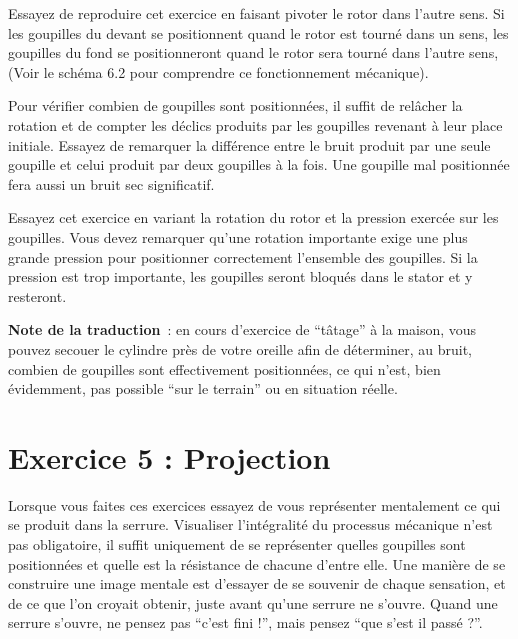 \documentclass[a4paper,french,11pt,twoside]{report}
\begin{document}
Essayez de reproduire cet exercice en faisant pivoter le rotor dans l'autre sens. Si les goupilles du devant se positionnent quand le rotor est tourné dans un sens, les goupilles du fond se positionneront quand le rotor sera tourné dans l'autre sens, (Voir le schéma 6.2 pour comprendre ce fonctionnement mécanique).

Pour vérifier combien de goupilles sont positionnées, il suffit de relâcher la rotation et de compter les déclics produits par les goupilles revenant à leur place initiale. Essayez de remarquer la différence entre le bruit produit par une seule goupille et celui produit par deux goupilles à la fois. Une goupille mal positionnée fera aussi un bruit sec significatif.

Essayez cet exercice en variant la rotation du rotor et la pression exercée sur les goupilles. Vous devez remarquer qu'une rotation importante exige une plus grande pression pour positionner correctement l'ensemble des goupilles. Si la pression est trop importante, les goupilles seront bloqués dans le stator et y resteront.

\noindent \textbf{Note de la traduction}~: en cours d'exercice de \enquote{tâtage} à la maison, vous pouvez secouer le cylindre près de votre oreille afin de déterminer, au bruit, combien de goupilles sont effectivement positionnées, ce qui n'est, bien évidemment, pas possible \enquote{sur le terrain} ou en situation réelle.

\section{Exercice 5 : Projection}

Lorsque vous faites ces exercices essayez de vous représenter mentalement ce qui se produit dans la serrure. Visualiser l'intégralité du processus mécanique n'est pas obligatoire, il suffit uniquement de se représenter quelles goupilles sont positionnées et quelle est la résistance de chacune d'entre elle. Une manière de se construire une image mentale est d'essayer de se souvenir de chaque sensation, et de ce que l'on croyait obtenir, juste avant qu'une serrure ne s'ouvre. Quand une serrure s'ouvre, ne pensez pas \enquote{c'est fini !}, mais pensez \enquote{que s'est il passé ?}.
\end{document}
